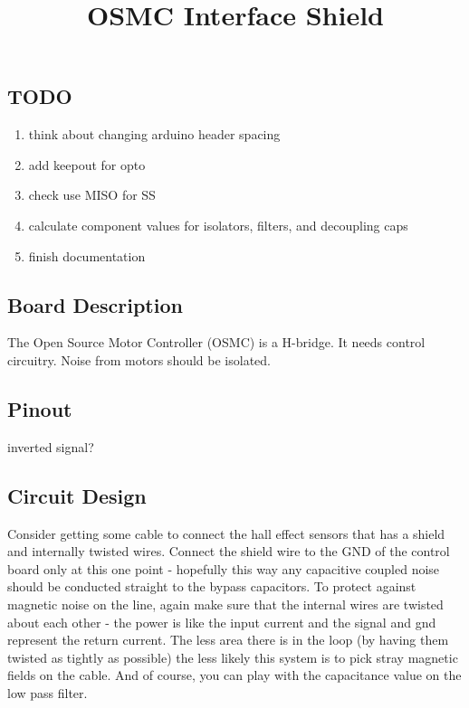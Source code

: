 \documentclass[letterpaper,12pt,notitlepage]{report}
\begin{document}
\title{OSMC Interface Shield}
\author{}
\date{}
\maketitle

\subsection{TODO}
\begin{enumerate}
 \item think about changing arduino header spacing
 \item add keepout for opto
 \item check use MISO for SS
 \item calculate component values for isolators, filters, and decoupling caps
 \item finish documentation
\end{enumerate}

\subsection{Board Description}
The Open Source Motor Controller (OSMC) is a H-bridge.  It needs control circuitry.  Noise from motors should be isolated.


\subsection{Pinout}

inverted signal?

\subsection{Circuit Design}

Consider getting some cable to connect the hall effect sensors that has a shield and internally twisted wires. Connect the shield wire to the GND of the control board only at this one point - hopefully this way any capacitive coupled noise should be conducted straight to the bypass capacitors. To protect against magnetic noise on the line, again make sure that the internal wires are twisted about each other - the power is like the input current and the signal and gnd represent the return current. The less area there is in the loop (by having them twisted as tightly as possible) the less likely this system is to pick stray magnetic fields on the cable. And of course, you can play with the capacitance value on the low pass filter. 
\end{document}
